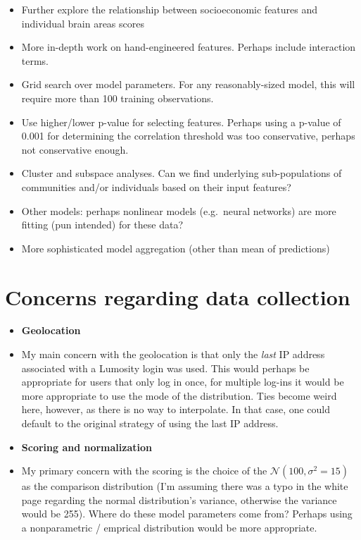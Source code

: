 \documentclass{article}
\begin{document}
\begin{itemize}
\itemsep1pt\parskip0pt
\item
  Further explore the relationship between socioeconomic features and
  individual brain areas scores
\item
  More in-depth work on hand-engineered features. Perhaps include
  interaction terms.
\item
  Grid search over model parameters. For any reasonably-sized model,
  this will require more than 100 training observations.
\item
  Use higher/lower p-value for selecting features. Perhaps using a
  p-value of 0.001 for determining the correlation threshold was too
  conservative, perhaps not conservative enough.
\item
  Cluster and subspace analyses. Can we find underlying sub-populations
  of communities and/or individuals based on their input features?
\item
  Other models: perhaps nonlinear models (e.g.~neural networks) are more
  fitting (pun intended) for these data?
\item
  More sophisticated model aggregation (other than mean of predictions)
\end{itemize}

    \section{Concerns regarding data
collection}\label{concerns-regarding-data-collection}

\begin{itemize}
\itemsep1pt\parskip0pt
\item
  \textbf{Geolocation}
\item
  My main concern with the geolocation is that only the \emph{last} IP
  address associated with a Lumosity login was used. This would perhaps
  be appropriate for users that only log in once, for multiple log-ins
  it would be more appropriate to use the mode of the distribution. Ties
  become weird here, however, as there is no way to interpolate. In that
  case, one could default to the original strategy of using the last IP
  address.
\item
  \textbf{Scoring and normalization}
\item
  My primary concern with the scoring is the choice of the
  $\mathcal{N}(100,\sigma^2 = 15)$ as the comparison distribution (I'm
  assuming there was a typo in the white page regarding the normal
  distribution's variance, otherwise the variance would be 255). Where
  do these model parameters come from? Perhaps using a nonparametric /
  emprical distribution would be more appropriate.
\end{itemize}
\end{document}
